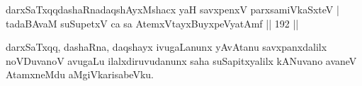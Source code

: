 \begin{shl}
darxSaTxqqdashaRnadaqshAyxMshacx yaH savxpenxV parxsamiVkaSxteV | \\
tadaBAvaM suSupetxV ca sa AtemxVtayxBuyxpeVyatAmf \hfill||  192 ||  
\end{shl}

\begin{artha}
darxSaTxqq, dashaRna, daqshayx ivugaLanunx yAvAtanu savxpanxdalilx noVDuvanoV avugaLu ilalxdiruvudanunx saha suSapitxyalilx kANuvano avaneV AtamxneMdu aMgiVkarisabeVku.
\end{artha}
